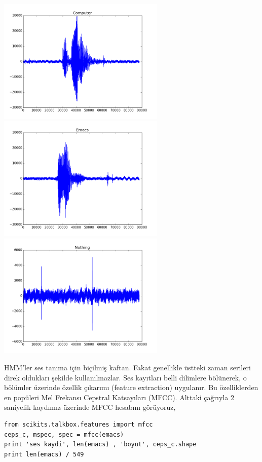 \documentclass[12pt,fleqn]{article}\usepackage{../../common}
\begin{document}
\includegraphics[height=6cm]{tser_hmm_05.png}
\includegraphics[height=6cm]{tser_hmm_06.png}
\includegraphics[height=6cm]{tser_hmm_07.png}

HMM'ler ses tanıma için biçilmiş kaftan. Fakat genellikle üstteki zaman
serileri direk oldukları şekilde kullanılmazlar. Ses kayıtları belli
dilimlere bölünerek, o bölümler üzerinde özellik çıkarımı (feature
extraction) uygulanır. Bu özelliklerden en popüleri Mel Frekansı Cepstral
Katsayıları (MFCC). Alttaki çağrıyla 2 saniyelik kaydımız üzerinde MFCC
hesabını görüyoruz,

\begin{verbatim}
from scikits.talkbox.features import mfcc
ceps_c, mspec, spec = mfcc(emacs)
print 'ses kaydi', len(emacs) , 'boyut', ceps_c.shape
print len(emacs) / 549
\end{verbatim}
\end{document}
